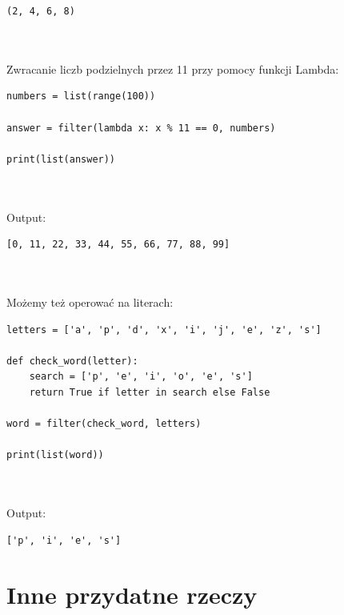 \documentclass[a4paper, 12pt]{article}
\begin{document}
\noindent\begin{minipage}{\linewidth}
\begin{lstlisting}[style=python]
(2, 4, 6, 8)
\end{lstlisting}
\end{minipage}
\\ \\
Zwracanie liczb podzielnych przez 11 przy pomocy funkcji Lambda:


\noindent\begin{minipage}{\linewidth}
\begin{lstlisting}[style=python]
numbers = list(range(100))

answer = filter(lambda x: x % 11 == 0, numbers)

print(list(answer))
\end{lstlisting}
\end{minipage}
\\ \\
Output:

\noindent\begin{minipage}{\linewidth}
\begin{lstlisting}[style=python]
[0, 11, 22, 33, 44, 55, 66, 77, 88, 99]
\end{lstlisting}
\end{minipage}
\\ \\ 
Możemy też operować na literach:


\noindent\begin{minipage}{\linewidth}
\begin{lstlisting}[style=python]
letters = ['a', 'p', 'd', 'x', 'i', 'j', 'e', 'z', 's']

def check_word(letter):
    search = ['p', 'e', 'i', 'o', 'e', 's']
    return True if letter in search else False

word = filter(check_word, letters)

print(list(word))
\end{lstlisting}
\end{minipage}
\\ \\
Output:

\noindent\begin{minipage}{\linewidth}
\begin{lstlisting}[style=python]
['p', 'i', 'e', 's']
\end{lstlisting}
\end{minipage}
\pagebreak

\section{Inne przydatne rzeczy}
\end{document}

